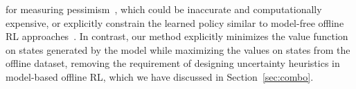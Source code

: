 for measuring pessimism~\citep{kidambi2020morel, yu2020mopo}, which could be inaccurate and computationally expensive, or explicitly constrain the learned policy similar to model-free offline RL approaches~\citep{matsushima2020deployment}.
In contrast, our method explicitly minimizes the value function on states generated by the model while maximizing the values on states from the offline dataset, removing the requirement of designing uncertainty heuristics in model-based offline RL, which we have discussed in Section~\ref{sec:combo}.
